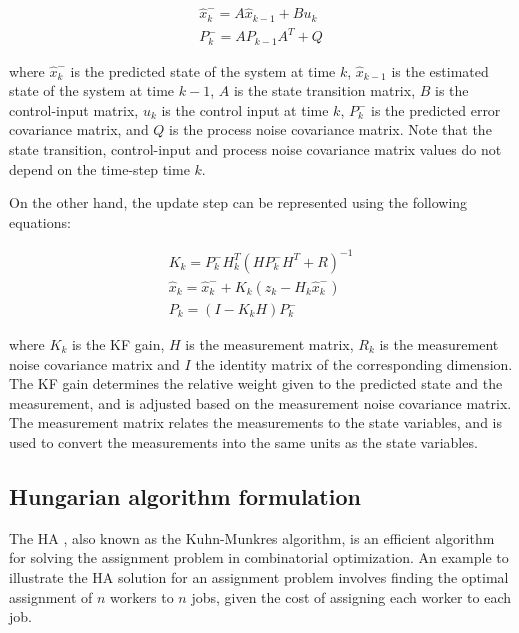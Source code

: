 \begin{equation}
	\begin{split}
		\hat{x}_k^- = A \hat{x}_{k-1} + B u_k \\
		P_k^- = A P_{k-1} A^T + Q
	\end{split}
\end{equation}

where $\hat{x}_k^-$ is the predicted state of the system at time $k$, $\hat{x}_{k-1}$ is the estimated state of the system at time $k-1$, $A$ is the state transition matrix, $B$ is the control-input matrix, $u_k$ is the control input at time $k$, $P_k^-$ is the predicted error covariance matrix, and $Q$ is the process noise covariance matrix. Note that the state transition, control-input and process noise covariance matrix values do not depend on the time-step time $k$.

On the other hand, the update step can be represented using the following equations:

\begin{equation}
	\begin{split}
		K_k = P_k^- H_k^T (H P_k^- H^T + R)^{-1} \\
		\hat{x}_k = \hat{x}_k^- + K_k (z_k - H_k \hat{x}_k^-) \\
		P_k = (I - K_k H) P_k^-
	\end{split}
\end{equation}

where $K_k$ is the \ac{KF} gain, $H$ is the measurement matrix, $R_k$ is the measurement noise covariance matrix and $I$ the identity matrix of the corresponding dimension. The \ac{KF} gain determines the relative weight given to the predicted state and the measurement, and is adjusted based on the measurement noise covariance matrix. The measurement matrix relates the measurements to the state variables, and is used to convert the measurements into the same units as the state variables.

\subsection{Hungarian algorithm formulation}
\label{subsec:3_HA_formulation}

The \acf{HA} \cite{kuhn1955hungarian}, also known as the Kuhn-Munkres algorithm, is an efficient algorithm for solving the assignment problem in combinatorial optimization. An example to illustrate the \ac{HA} solution for an assignment problem involves finding the optimal assignment of $n$ workers to $n$ jobs, given the cost of assigning each worker to each job.

